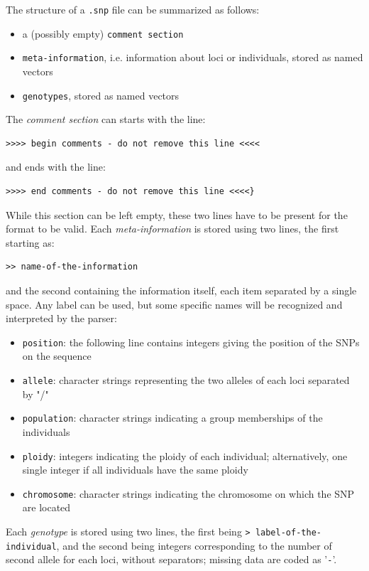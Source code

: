 \documentclass{article}
\begin{document}
The structure of a \texttt{.snp} file can be summarized as follows:
\begin{itemize}
\item a (possibly empty) \texttt{comment section}
\item \texttt{meta-information}, i.e. information about loci or individuals, stored as named vectors
\item \texttt{genotypes}, stored as named vectors
\end{itemize}

The \textit{comment section} can starts with the line:\\
\begin{verbatim}
>>>> begin comments - do not remove this line <<<<
\end{verbatim}
\noindent and ends with the line:\\
\begin{verbatim}
>>>> end comments - do not remove this line <<<<}
\end{verbatim}
\noindent While this section can be left empty, these two lines have to be present for the format to
be valid.
Each \textit{meta-information} is stored using two lines, the first starting as:
\begin{verbatim}
>> name-of-the-information
\end{verbatim}
and the second containing the information itself, each item separated by a single space.
Any label can be used, but some specific names will be recognized and interpreted by the parser:
\begin{itemize}
\item \texttt{position}: the following line contains integers giving the position of the SNPs on the sequence
\item \texttt{allele}: character strings representing the two alleles of each loci separated by "/"
\item \texttt{population}: character strings indicating a group memberships of the individuals
\item \texttt{ploidy}: integers indicating the ploidy of each individual; alternatively, one single integer if
all individuals have the same ploidy
\item \texttt{chromosome}: character strings indicating the chromosome on which the SNP are located
\end{itemize}
Each \textit{genotype} is stored using two lines, the first being
\texttt{> label-of-the-individual}, and the second being integers corresponding to the number of
second allele for each loci, without separators; missing data are coded as '\texttt{-}'.
\\
\end{document}
